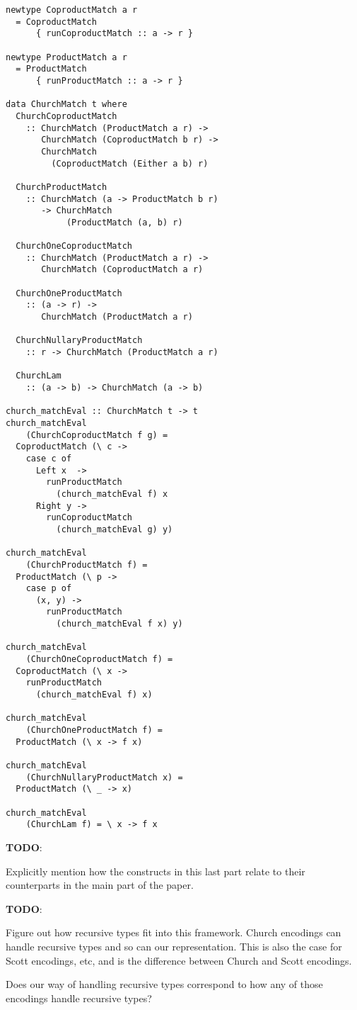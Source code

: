 \documentclass[sigplan,anonymous,review]{acmart}
\newenvironment{todo}
  {\begin{tcolorbox}
   \textbf{TODO}:
  }
  {\end{tcolorbox}
  }
\begin{document}
\begin{lstlisting}
newtype CoproductMatch a r
  = CoproductMatch
      { runCoproductMatch :: a -> r }

newtype ProductMatch a r
  = ProductMatch
      { runProductMatch :: a -> r }

data ChurchMatch t where
  ChurchCoproductMatch
    :: ChurchMatch (ProductMatch a r) ->
       ChurchMatch (CoproductMatch b r) ->
       ChurchMatch
         (CoproductMatch (Either a b) r)

  ChurchProductMatch
    :: ChurchMatch (a -> ProductMatch b r)
       -> ChurchMatch
            (ProductMatch (a, b) r)

  ChurchOneCoproductMatch
    :: ChurchMatch (ProductMatch a r) ->
       ChurchMatch (CoproductMatch a r)

  ChurchOneProductMatch
    :: (a -> r) ->
       ChurchMatch (ProductMatch a r)

  ChurchNullaryProductMatch
    :: r -> ChurchMatch (ProductMatch a r)

  ChurchLam
    :: (a -> b) -> ChurchMatch (a -> b)

church_matchEval :: ChurchMatch t -> t
church_matchEval
    (ChurchCoproductMatch f g) =
  CoproductMatch (\ c ->
    case c of
      Left x  ->
        runProductMatch
          (church_matchEval f) x
      Right y ->
        runCoproductMatch
          (church_matchEval g) y)

church_matchEval
    (ChurchProductMatch f) =
  ProductMatch (\ p ->
    case p of
      (x, y) ->
        runProductMatch
          (church_matchEval f x) y)

church_matchEval
    (ChurchOneCoproductMatch f) =
  CoproductMatch (\ x ->
    runProductMatch
      (church_matchEval f) x)

church_matchEval
    (ChurchOneProductMatch f) =
  ProductMatch (\ x -> f x)

church_matchEval
    (ChurchNullaryProductMatch x) =
  ProductMatch (\ _ -> x)

church_matchEval
    (ChurchLam f) = \ x -> f x
\end{lstlisting}

\begin{todo}
  Explicitly mention how the constructs in this last part
  relate to their counterparts in the main part of the paper.
\end{todo}

\begin{todo}
  Figure out how recursive types fit into this framework. Church encodings can
  handle recursive types and so can our representation. This is also the case
  for Scott encodings, etc, and is the difference between Church and Scott
  encodings.

  Does our way of handling recursive types correspond to how any of
  those encodings handle recursive types?
\end{todo}
\end{document}
